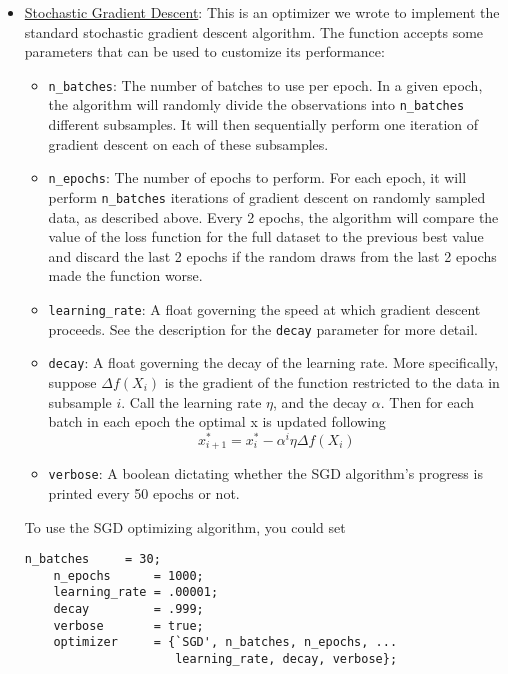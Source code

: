 \documentclass[12pt]{article}
\begin{document}
\begin{itemize}
    \item \underline{Stochastic Gradient Descent}: This is an optimizer we wrote to implement the standard stochastic gradient descent algorithm. The function accepts some parameters that can be used to customize its performance:
    \begin{itemize}
        \item \lstinline{n_batches}: The number of batches to use per epoch. In a given epoch, the algorithm will randomly divide the observations into \lstinline{n_batches} different subsamples. It will then sequentially perform one iteration of gradient descent on each of these subsamples.
        \item \lstinline{n_epochs}: The number of epochs to perform. For each epoch, it will perform \lstinline{n_batches} iterations of gradient descent on randomly sampled data, as described above. Every 2 epochs, the algorithm will compare the value of the loss function for the full dataset to the previous best value and discard the last 2 epochs if the random draws from the last 2 epochs made the function worse.
        \item \lstinline{learning_rate}: A float governing the speed at which gradient descent proceeds. See the description for the \lstinline{decay} parameter for more detail.
        \item \lstinline{decay}: A float governing the decay of the learning rate. More specifically, suppose $\Delta f(X_i)$ is the gradient of the function restricted to the data in subsample $i$. Call the learning rate $\eta$, and the decay $\alpha$. Then for each batch in each epoch the optimal x is updated following
        \begin{equation}
            x^*_{i+1} = x^*_i - \alpha^i \eta \Delta f(X_i)
        \end{equation}
        \item \lstinline{verbose}: A boolean dictating whether the SGD algorithm's progress is printed every 50 epochs or not.
    \end{itemize}
    To use the SGD optimizing algorithm, you could set

    \lstset{language=matlab}
    \begin{lstlisting}[backgroundcolor = \color{codeyellow}]
    n_batches     = 30;
    n_epochs      = 1000;
    learning_rate = .00001;
    decay         = .999;
    verbose       = true;
    optimizer     = {`SGD', n_batches, n_epochs, ...
                     learning_rate, decay, verbose};
    \end{lstlisting}


\end{itemize}
\end{document}
